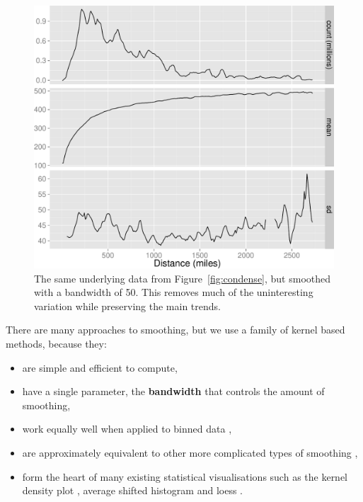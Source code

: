 \documentclass[journal]{vgtc}                %
\begin{document}
\begin{figure}[htb]
 \centering
 \includegraphics[width=\linewidth]{smooth}
 \caption{The same underlying data from Figure~\ref{fig:condense}, but smoothed with a bandwidth of 50. This removes much of the uninteresting variation while preserving the main trends.}
 \label{fig:smooth}
\end{figure}

There are many approaches to smoothing, but we use a family of kernel based methods, because they:

\begin{itemize}
  \item are simple and efficient to compute,
  
  \item have a single parameter, the {\bf bandwidth} that controls the amount of smoothing,

  \item work equally well when applied to binned data \cite{wand:1994},
  
  \item are approximately equivalent to other more complicated types of smoothing \citep{silverman:1984}, 
  
  \item form the heart of many existing statistical visualisations such as the kernel density plot \citep{scott:1992}, average shifted histogram \citep{scott:1985} and loess \citep{cleveland:1979}.

\end{itemize}
\end{document}
